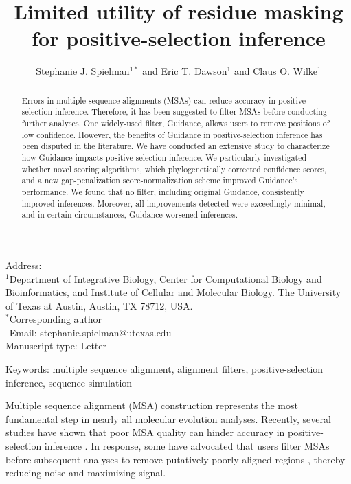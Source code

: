 \documentclass[11pt]{article}
\begin{document}
\title{\textbf{Limited utility of residue masking for positive-selection inference}}
\author{Stephanie J. Spielman$^{1*}$ and Eric T. Dawson$^{1}$ and Claus O. Wilke$^{1}$}
\date{}

\maketitle
\noindent
Address:\\
$^1$Department of Integrative Biology, Center for Computational Biology and Bioinformatics, and Institute of Cellular and Molecular Biology.
The University of Texas at Austin, Austin, TX 78712, USA.\\

\bigskip
\noindent
$^*$Corresponding author\\
$\phantom{^*}$Email: stephanie.spielman@utexas.edu\\

\bigskip
\noindent
Manuscript type: Letter

\bigskip
\noindent Keywords: multiple sequence alignment, alignment filters, positive-selection inference, sequence simulation

\newpage
\begin{abstract}
Errors in multiple sequence alignments (MSAs) can reduce accuracy in positive-selection inference. Therefore, it has been suggested to filter MSAs before conducting further analyses. One widely-used filter, Guidance, allows users to remove positions of low confidence. However, the benefits of Guidance in positive-selection inference has been disputed in the literature. We have conducted an extensive study to characterize how Guidance impacts positive-selection inference. We particularly investigated whether novel scoring algorithms, which phylogenetically corrected confidence scores, and a new gap-penalization score-normalization scheme improved Guidance's performance. We found that no filter, including original Guidance, consistently improved inferences. Moreover, all improvements detected were exceedingly minimal, and in certain circumstances, Guidance worsened inferences.
\end{abstract}

Multiple sequence alignment (MSA) construction represents the most fundamental step in nearly all molecular evolution analyses. Recently, several studies have shown that poor MSA quality can hinder accuracy in positive-selection inference \citep{Schneider2009, Fletcher2010, MarkovaRaina2011}. In response, some have advocated that users filter MSAs before subsequent analyses to remove putatively-poorly aligned regions \citep{Privman2012,Jordan2012}, thereby reducing noise and maximizing signal.
\end{document}

